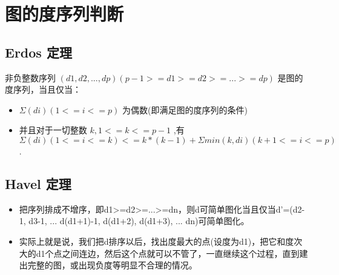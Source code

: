 \section{图的度序列判断}
\subsection{Erdos 定理}
\par 非负整数序列 $(d1,d2,...,dp) (p-1>=d1>=d2>=...>=dp)$ 是图的度序列，当且仅当：
\begin{itemize}
    \item $\Sigma(di)(1<=i<=p)$ 为偶数(即满足图的度序列的条件)
    \item 并且对于一切整数 $k,1<=k<=p-1$ ,有 $\Sigma(di)(1<=i<=k)<=k*(k-1)+\Sigma min(k,di)(k+1<=i<=p)$.
\end{itemize}
\subsection{Havel 定理}
\begin{itemize}
\item 把序列排成不增序，即d1>=d2>=...>=dn，则d可简单图化当且仅当d'=(d2-1, d3-1, ... d(d1+1)-1, d(d1+2), d(d1+3), ... dn)可简单图化。
\
\item 实际上就是说，我们把d排序以后，找出度最大的点(设度为d1)，把它和度次大的d1个点之间连边，然后这个点就可以不管了，一直继续这个过程，直到建出完整的图，或出现负度等明显不合理的情况。
\end{itemize}